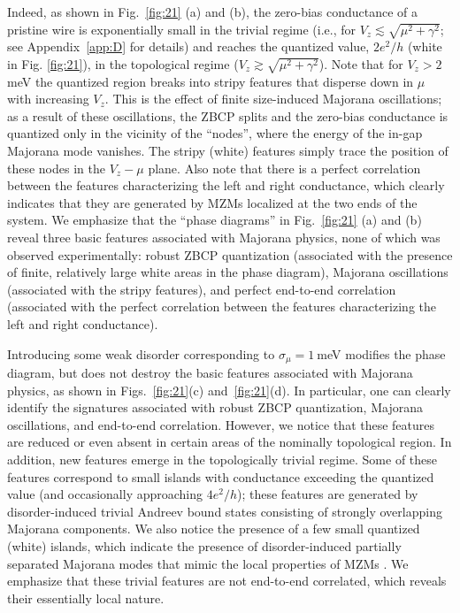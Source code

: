 \documentclass[aps,prmaterials,twocolumn,superscriptaddress,longbibliography]{revtex4-2}
\begin{document}
Indeed, as shown in  Fig.~\ref{fig:21} (a) and (b), the zero-bias conductance of a pristine wire is exponentially small in the trivial regime  (i.e., for $V_z \lesssim\sqrt{\mu^2+\gamma^2}$; see Appendix~\ref{app:D} for details) and reaches the quantized value, $2 e^2/h$ (white in Fig. \ref{fig:21}),  in the topological regime ($V_z\gtrsim\sqrt{\mu^2+\gamma^2}$). Note that for $V_z > 2~$meV the quantized region breaks into stripy features that disperse down in $\mu$ with increasing $V_z$. This is the effect of finite size-induced Majorana oscillations; as a result of these oscillations, the ZBCP splits and the zero-bias conductance is quantized only in the vicinity of the ``nodes'', where the energy of the in-gap Majorana mode vanishes. The stripy (white) features simply trace the position of these nodes in the $V_z-\mu$ plane. Also note that there is a perfect correlation between the features characterizing the left and right conductance, which clearly indicates that they are generated by MZMs localized at the two ends of the system.   We emphasize that the ``phase diagrams'' in Fig.~\ref{fig:21} (a) and (b) reveal three basic features associated with Majorana physics, none of which was observed experimentally: robust ZBCP quantization (associated with the presence of finite, relatively large white areas in the phase diagram), Majorana oscillations (associated with the stripy features), and perfect end-to-end correlation (associated with the perfect correlation between the features characterizing the left and right conductance). 

Introducing some weak disorder corresponding to $\sigma_\mu=1~$meV modifies the phase diagram, but does not destroy the basic features associated with Majorana physics, as shown in Figs.~\ref{fig:21}(c) and~\ref{fig:21}(d).
In particular, one can clearly identify the signatures associated with robust ZBCP quantization, Majorana oscillations, and end-to-end correlation. However, we notice that these features are reduced or even absent in certain areas of the nominally topological region. In addition, new features emerge in the topologically trivial regime. Some of these features correspond to small islands with conductance exceeding the quantized value (and occasionally approaching $4e^2/h$); these features are generated by disorder-induced trivial Andreev bound states consisting of strongly overlapping Majorana components. We also notice the presence of a few small quantized (white) islands, which indicate the presence of disorder-induced partially separated Majorana modes that mimic the local properties of MZMs  \cite{zeng2021partiallyseparated}. We emphasize that these trivial features are not end-to-end correlated, which reveals their essentially local nature. 
\end{document}
